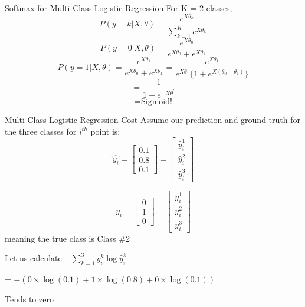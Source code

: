 \documentclass{beamer}
\begin{document}
\begin{frame}{Softmax for Multi-Class Logistic Regression}
For K = 2 classes,
\begin{equation*}
P(y = k|X, \theta) = \frac{e^{X\theta_{k}}}{\sum_{k=1}^{K}e^{X\theta_{k}}}
\end{equation*}
\begin{equation*}
P(y = 0|X, \theta) = \frac{e^{X\theta_{0}}}{e^{X\theta_{0}} + e^{X\theta_{1}}}
\end{equation*}
\begin{equation*}
P(y = 1|X, \theta) = \frac{e^{X\theta_{1}}}{e^{X\theta_{0}} + e^{X\theta_{1}}} = \frac{e^{X\theta_{1}}}{e^{X\theta_{1}}\{1 + e^{X(\theta_{0} - \theta_{1})}\}}
\end{equation*}
\begin{equation*}
= \frac{1}{1 + e^{-X\theta^{'}}}
\end{equation*}
\begin{equation*}
= \text{Sigmoid!}
\end{equation*}
\end{frame}

\begin{frame}{Multi-Class Logistic Regression Cost}
Assume our prediction and ground truth  for the three classes for $i^{th}$ point is:
$$
\hat{y_i} = \begin{bmatrix}
	0.1\\0.8\\0.1
\end{bmatrix} = \begin{bmatrix}
\hat{y}_i^1\\\hat{y}_i^2\\\hat{y}_i^3
\end{bmatrix} 
$$

$$
y_i = \begin{bmatrix}
0\\1\\0
\end{bmatrix}=\begin{bmatrix}
y_i^1\\y_i^2\\ y_i^3
\end{bmatrix}
$$
meaning the true class is Class \#2

\pause Let us calculate $-\sum_{k=1}^{3}y_i^k \log{\hat{y}_i^k} $

\pause  = $-(0\times \log(0.1) + 1\times \log(0.8) + 0\times \log(0.1))$

\pause Tends to zero

\end{frame}
\end{document}

